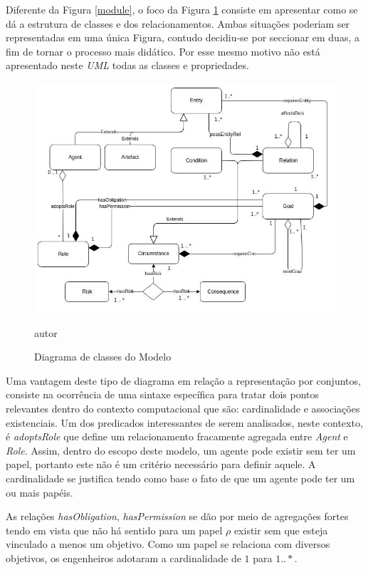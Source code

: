 Diferente da Figura \ref{module}, o foco da Figura \ref{classdiagrama} consiste em apresentar como se dá a estrutura de classes e dos relacionamentos. Ambas situações poderiam ser representadas em uma única Figura, contudo decidiu-se por seccionar em duas, a fim de tornar o processo mais didático. Por esse mesmo motivo não está apresentado neste \textit{UML} todas as classes e propriedades.  

\begin{figure}[H]
  \centering
  \caption{Diagrama de classes do Modelo}
  \includegraphics[width=1\linewidth]{figure/Class.jpg} 
  \begin{center}
  	autor
  \end{center}
  \label{classdiagrama}
\end{figure}

Uma vantagem deste tipo de diagrama em relação a representação por conjuntos, consiste na ocorrência de uma sintaxe específica para tratar dois pontos relevantes dentro do contexto computacional que são: cardinalidade e associações existenciais. Um dos predicados interessantes de serem analisados, neste contexto, é \textit{adoptsRole} que define um relacionamento fracamente agregada entre \textit{Agent} e \textit{Role}. Assim, dentro do escopo deste modelo, um agente pode existir sem ter um papel, portanto este não é um critério necessário para definir aquele. A cardinalidade se justifica tendo como base o fato de que um agente pode ter um ou mais papéis. 

As relações \textit{hasObligation}, \textit{hasPermission} se dão por meio de agregações fortes tendo em vista que não há sentido para um papel $\rho$ existir sem que esteja vinculado a menos um objetivo. Como um papel se relaciona com diversos objetivos, os engenheiros adotaram a cardinalidade de $1$ para $1 .. *$.

